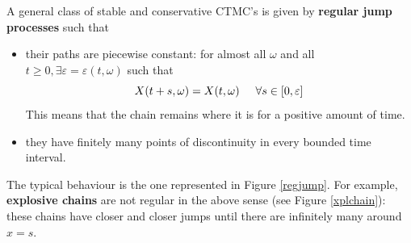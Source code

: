 \documentclass{article}
\begin{document}
\begin{definition}
    A general class of stable and conservative CTMC's is given by \textbf{regular jump processes} such that 
        \begin{itemize}
            \item their paths are piecewise constant: for almost all $\omega$ and all $t \geqslant 0, \exists \varepsilon = \varepsilon(t,\omega)$ such that 
            \begin{equation*}
                X(t+s,\omega) = X(t,\omega) \hspace{0.5 cm} \forall s \in [0,\varepsilon]
            \end{equation*}
                This means that the chain remains where it is for a positive amount of time. 
            \item they have finitely many points of discontinuity in every bounded time interval.
        \end{itemize}
\end{definition}
The typical behaviour is the one represented in Figure \ref{regjump}. %
For example, \textbf{explosive chains} are not regular in the above sense (see Figure \ref{xplchain}): these chains have closer and closer jumps until there are infinitely many around $x=s$.%
\end{document}
